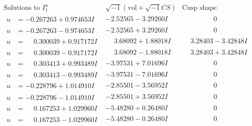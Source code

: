 \documentclass[1p]{elsarticle_modified}
\theoremstyle{definition}
\newcommand{\I}{\sqrt{-1}}
\begin{document}
$$\begin{array}{c|c|c}  
\text{Solutions to }I^u_{1}& \I (\text{vol} + \sqrt{-1}CS) & \text{Cusp shape}\\
 \hline 
\begin{aligned}
u &= -0.267263 + 0.974653 I\end{aligned}
 & -2.52565 - 3.29260 I & \phantom{-0.000000 } 0 \\ \hline\begin{aligned}
u &= -0.267263 - 0.974653 I\end{aligned}
 & -2.52565 + 3.29260 I & \phantom{-0.000000 } 0 \\ \hline\begin{aligned}
u &= \phantom{-}0.300039 + 0.917172 I\end{aligned}
 & \phantom{-}3.68092 + 1.88018 I & \phantom{-}3.28403 - 3.42848 I \\ \hline\begin{aligned}
u &= \phantom{-}0.300039 - 0.917172 I\end{aligned}
 & \phantom{-}3.68092 - 1.88018 I & \phantom{-}3.28403 + 3.42848 I \\ \hline\begin{aligned}
u &= \phantom{-}0.303413 + 0.993489 I\end{aligned}
 & -3.97531 + 7.01696 I & \phantom{-0.000000 } 0 \\ \hline\begin{aligned}
u &= \phantom{-}0.303413 - 0.993489 I\end{aligned}
 & -3.97531 - 7.01696 I & \phantom{-0.000000 } 0 \\ \hline\begin{aligned}
u &= -0.228796 + 1.014910 I\end{aligned}
 & -2.85501 - 3.56952 I & \phantom{-0.000000 } 0 \\ \hline\begin{aligned}
u &= -0.228796 - 1.014910 I\end{aligned}
 & -2.85501 + 3.56952 I & \phantom{-0.000000 } 0 \\ \hline\begin{aligned}
u &= \phantom{-}0.167253 + 1.029960 I\end{aligned}
 & -5.48280 + 0.26480 I & \phantom{-0.000000 } 0 \\ \hline\begin{aligned}
u &= \phantom{-}0.167253 - 1.029960 I\end{aligned}
 & -5.48280 - 0.26480 I & \phantom{-0.000000 } 0 \\ \hline\begin{aligned}

\end{aligned}
\end{array}$$
\end{document}
